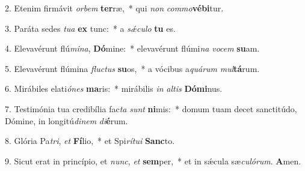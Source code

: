 2. Etenim firmávit \textit{or}\textit{bem} \textbf{ter}ræ,~*  qui \textit{non} \textit{com}\textit{mo}\textbf{vé}\textbf{bi}tur.\

3. Paráta sedes \textit{tu}\textit{a} \textbf{ex} tunc:~*  a \textit{sǽ}\textit{cu}\textit{lo} \textbf{tu} es.\

4. Elevavérunt flú\textit{mi}\textit{na}, \textbf{Dó}mine:~*  elevavérunt flúmi\textit{na} \textit{vo}\textit{cem} \textbf{su}am.\

5. Elevavérunt flúmina \textit{fluc}\textit{tus} \textbf{su}os,~*  a vócibus a\textit{quá}\textit{rum} \textit{mul}\textbf{tá}rum.\

6. Mirábiles elati\textit{ó}\textit{nes} \textbf{ma}ris:~*  mirábilis \textit{in} \textit{al}\textit{tis} \textbf{Dó}\textbf{mi}nus.\

7. Testimónia tua credibília fac\textit{ta} \textit{sunt} \textbf{ni}mis:~*  domum tuam decet sanctitúdo, Dómine, in longitú\textit{di}\textit{nem} \textit{di}\textbf{é}rum.\

8. Glória Pa\textit{tri}, \textit{et} \textbf{Fí}lio,~*  et Spi\textit{rí}\textit{tu}\textit{i} \textbf{Sanc}to.\

9. Sicut erat in princípio, et \textit{nunc}, \textit{et} \textbf{sem}per,~*  et in sǽcula sæ\textit{cu}\textit{ló}\textit{rum}. \textbf{A}men.\

